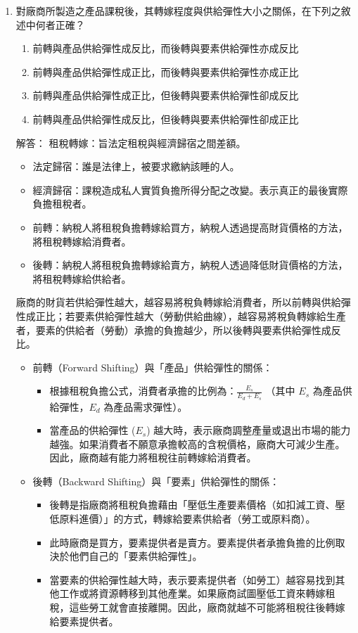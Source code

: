\documentclass[12pt, a4paper]{article}
\begin{document}
\begin{enumerate}
    \item 對廠商所製造之產品課稅後，其轉嫁程度與供給彈性大小之關係，在下列之敘述中何者正確？
    \begin{enumerate}[label=\Alph*.]
        \item 前轉與產品供給彈性成反比，而後轉與要素供給彈性亦成反比
        \item 前轉與產品供給彈性成正比，而後轉與要素供給彈性亦成正比
        \item 前轉與產品供給彈性成正比，但後轉與要素供給彈性卻成反比
        \item 前轉與產品供給彈性成反比，但後轉與要素供給彈性卻成正比
    \end{enumerate}
    解答：
    租稅轉嫁：旨法定租稅與經濟歸宿之間差額。
    \begin{itemize}
        \item 法定歸宿：誰是法律上，被要求繳納該睡的人。
        \item 經濟歸宿：課稅造成私人實質負擔所得分配之改變。表示真正的最後實際負擔租稅者。
        \item 前轉：納稅人將租稅負擔轉嫁給買方，納稅人透過提高財貨價格的方法，將租稅轉嫁給消費者。
        \item 後轉：納稅人將租稅負擔轉嫁給賣方，納稅人透過降低財貨價格的方法，將租稅轉嫁給供給者。
    \end{itemize}
    廠商的財貨若供給彈性越大，越容易將稅負轉嫁給消費者，所以前轉與供給彈性成正比；若要素供給彈性越大（勞動供給曲線），越容易將稅負轉嫁給生產者，要素的供給者（勞動）承擔的負擔越少，所以後轉與要素供給彈性成反比。

    \begin{itemize}
        \item 前轉（Forward Shifting）與「產品」供給彈性的關係：
        \begin{itemize}
            \item 根據租稅負擔公式，消費者承擔的比例為：\(\frac{E_s}{E_d + E_s}\) （其中 \(E_s\) 為產品供給彈性，\(E_d\) 為產品需求彈性）。
            \item 當產品的供給彈性 (\(E_s\)) 越大時，表示廠商調整產量或退出市場的能力越強。如果消費者不願意承擔較高的含稅價格，廠商大可減少生產。因此，廠商越有能力將租稅往前轉嫁給消費者。
        \end{itemize}
        \item 後轉（Backward Shifting）與「要素」供給彈性的關係：
        \begin{itemize}
            \item 後轉是指廠商將租稅負擔藉由「壓低生產要素價格（如扣減工資、壓低原料進價）」的方式，轉嫁給要素供給者（勞工或原料商）。
            \item 此時廠商是買方，要素提供者是賣方。要素提供者承擔負擔的比例取決於他們自己的「要素供給彈性」。
            \item 當要素的供給彈性越大時，表示要素提供者（如勞工）越容易找到其他工作或將資源轉移到其他產業。如果廠商試圖壓低工資來轉嫁租稅，這些勞工就會直接離開。因此，廠商就越不可能將租稅往後轉嫁給要素提供者。
        \end{itemize}
    \end{itemize}


\end{enumerate}
\end{document}
